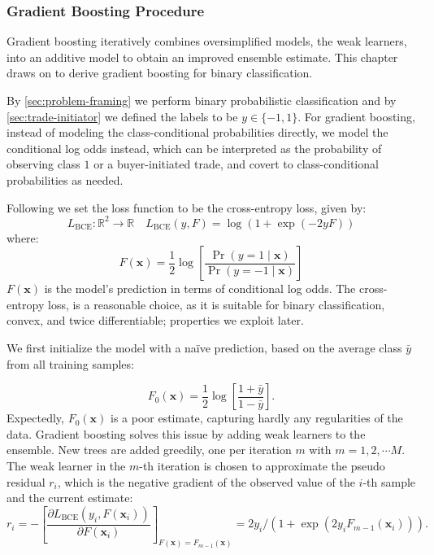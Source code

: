 \subsubsection{Gradient Boosting
    Procedure}\label{sec:gradient-boosting-procedure}

Gradient boosting iteratively combines oversimplified models, the weak learners, into an additive model to obtain an improved ensemble estimate. This chapter draws on \textcite[][1198--1199]{friedmanGreedyFunctionApproximation2001} to derive gradient boosting for binary classification.

By \cref{sec:problem-framing} we perform binary probabilistic classification and by \cref{sec:trade-initiator} we defined the labels to be $y \in \{-1,1\}$. For gradient boosting, instead of modeling the class-conditional probabilities directly, we model the conditional log odds instead, which can be interpreted as the probability of observing class $1$ or a buyer-initiated trade, and covert to class-conditional probabilities as needed.

Following \textcite[][1198]{friedmanStochasticGradientBoosting2002} we set the loss function to be the cross-entropy loss, given by:
\begin{equation}
    L_{\mathrm{BCE}} \colon \mathbb{R}^2 \to \mathbb{R} \quad L_{\mathrm{BCE}}(y, F) = \log(1+\exp(-2yF))
    \label{eq:cross-entropy-loss}
\end{equation}
where:
\begin{equation}
    F(\mathbf{x}) = \frac{1}{2} \log \left[\frac{\Pr(y=1\mid \mathbf{x})}{\Pr(y=-1\mid \mathbf{x})}\right]
    \label{eq:logits-gbm}
\end{equation}
$F(\mathbf{x})$ is the model's prediction in terms of conditional log odds. The cross-entropy loss, is a reasonable choice, as it is suitable for binary classification, convex, and twice differentiable; properties we exploit later.

We first initialize the model with a naïve prediction, based on the average class $\bar{y}$ from all training samples:

\begin{equation}
    F_0(\mathbf{x})= \frac{1}{2} \log \left[\frac{1+\bar{y}}{1-\bar{y}}\right].
\end{equation}
Expectedly, $F_0(\mathbf{x})$ is a poor estimate, capturing hardly any regularities of the data. Gradient boosting solves this issue by adding weak learners to the ensemble. New trees are added greedily, one per iteration $m$ with $m=1,2,\cdots M$. The weak learner in the $m$-th iteration is chosen to approximate the pseudo residual $r_i$, which is the negative gradient of the observed value of the $i$-th sample and the current estimate:
\begin{equation}
    r_i=-\left[\frac{\partial L_{\mathrm{BCE}}\left(y_i, F\left(\mathbf{x}_i\right)\right)}{\partial F\left(\mathbf{x}_i\right)}\right]_{F(\mathbf{x})=F_{m-1}(\mathbf{x})}=2 y_i /\left(1+\exp \left(2 y_i F_{m-1}\left(\mathbf{x}_i\right)\right)\right).
\end{equation}


